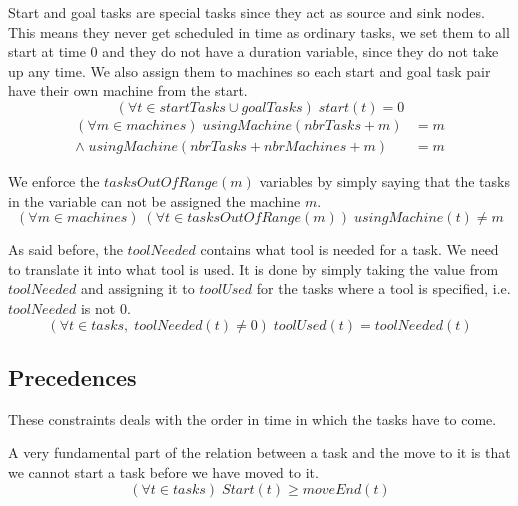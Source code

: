   \noindent Start and goal tasks are special tasks since they act as source and sink nodes. This means they never get scheduled in time as ordinary tasks, we set them to all start at time $0$ and they do not have a duration variable, since they do not take up any time. We also assign them to machines so each start and goal task pair have their own machine from the start.
 \begin{equation}\label{eq:93}
 (\forall t \in startTasks \cup goalTasks) \; start(t) = 0
 \end{equation}
 \begin{equation}
 \begin{aligned}\label{eq:94}
 (\forall m \in machines) \; usingMachine(nbrTasks + m) &= m\\
 \land \; usingMachine(nbrTasks + nbrMachines + m) &= m
 \end{aligned}
 \end{equation}

  \noindent We enforce the $tasksOutOfRange(m)$ variables by simply saying that the tasks in the variable can not be assigned the machine $m$.
 \begin{equation}\label{eq:95}
 (\forall m \in machines) \; (\forall t \in tasksOutOfRange(m)) \; usingMachine(t) \neq m
 \end{equation}

  \noindent As said before, the $toolNeeded$ contains what tool is needed for a task. We need to translate it into what tool is used. It is done by simply taking the value from $toolNeeded$ and assigning it to $toolUsed$ for the tasks where a tool is specified, i.e. $toolNeeded$ is not $0$.
 \begin{equation}\label{eq:117}
 (\forall t \in tasks, \; toolNeeded(t) \neq 0) \; toolUsed(t) = toolNeeded(t)
 \end{equation}

 
 \subsection{Precedences}
 These constraints deals with the order in time in which the tasks have to come.

  \noindent A very fundamental part of the relation between a task and the move to it is that we cannot start a task before we have moved to it.
  \begin{equation}\label{eq:107}
  (\forall t \in tasks) \; Start(t) \geq moveEnd(t)
  \end{equation}

